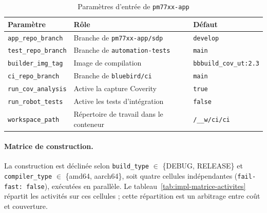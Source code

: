 \begin{table}[H]
\centering
\caption{Paramètres d'entrée de \texttt{pm77xx-app}}
\label{tab:impl-parametres-app}
\small
\begin{tabularx}{\textwidth}{@{}l X l@{}}
\toprule
\textbf{Paramètre} & \textbf{Rôle} & \textbf{Défaut} \\
\midrule
\texttt{app\_repo\_branch} & Branche de \texttt{pm77xx-app/sdp} & \texttt{develop} \\
\texttt{test\_repo\_branch} & Branche de \texttt{automation-tests} & \texttt{main} \\
\texttt{builder\_img\_tag} & Image de compilation & \texttt{bbbuild\_cov\_ut:2.3} \\
\texttt{ci\_repo\_branch} & Branche de \texttt{bluebird/ci} & \texttt{main} \\
\texttt{run\_cov\_analysis} & Active la capture Coverity & \texttt{true} \\
\texttt{run\_robot\_tests} & Active les tests d'intégration & \texttt{false} \\
\texttt{workspace\_path} & Répertoire de travail dans le conteneur & \texttt{/\_\_w/ci/ci} \\
\bottomrule
\end{tabularx}
\end{table}

\paragraph{Matrice de construction.} La construction est déclinée selon
\texttt{build\_type} $\in$ \{DEBUG, RELEASE\} et \texttt{compiler\_type}
$\in$ \{amd64, aarch64\}, soit quatre cellules indépendantes
(\texttt{fail-fast: false}), exécutées en parallèle. Le
tableau~\ref{tab:impl-matrice-activites} répartit les activités sur ces
cellules ; cette répartition est un arbitrage entre coût et couverture.

